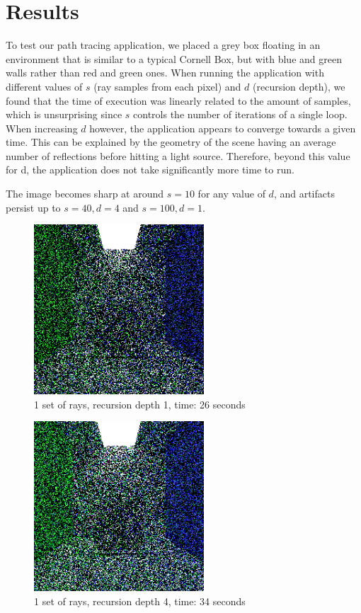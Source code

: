 \documentclass[journal]{IEEEtran}
\begin{document}
\section{Results}

To test our path tracing application, we placed a grey box floating in an environment that is similar to a typical Cornell Box, but with blue and green walls rather than red and green ones. When running the application with different values of $s$ (ray samples from each pixel) and $d$ (recursion depth), we found that the time of execution was linearly related to the amount of samples, which is unsurprising since $s$ controls the number of iterations of a single loop. When increasing $d$ however, the application appears to converge towards a given time. This can be explained by the geometry of the scene having an average number of reflections before hitting a light source. Therefore, beyond this value for d, the application does not take significantly more time to run.

\par
The image becomes sharp at around $s=10$ for any value of $d$, and artifacts persist up to $s=40, d=4$ and $s=100,d=1$.

\begin{figure}[!t]

\centering
\includegraphics[width=2.5in]{1s_1d_26s}
\caption{1 set of rays, recursion depth 1, time: 26 seconds}
\label{1s_1d_26s}

\end{figure}

\begin{figure}[!t]

\centering
\includegraphics[width=2.5in]{1s_4d_34s}
\caption{1 set of rays, recursion depth 4, time: 34 seconds}
\label{1s_4d_34s}

\end{figure}
\end{document}
